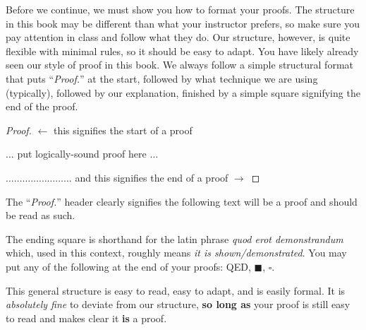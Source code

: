 \documentclass[main.tex]{subfiles}
\begin{document}
Before we continue, we must show you how to format your proofs. The structure in this book may be different than what your instructor prefers, so make sure you pay attention in class and follow what they do. Our structure, however, is quite flexible with minimal rules, so it should be easy to adapt. You have likely already seen our style of proof in this book. We always follow a simple structural format that puts ``\textit{Proof.}'' at the start, followed by what technique we are using (typically), followed by our explanation, finished by a simple square signifying the end of the proof.

\begin{proof}
	\(\leftarrow\) this signifies the start of a proof
	
	\vspace{2em}
	
	\begin{center}
		\(\dots\) put logically-sound proof here \(\dots\)
	\end{center}
	
	\vspace{2em}
	
	\hfill \(\dots \dots \dots \dots \dots \dots \dots \dots \) and this signifies the end of a proof \(\rightarrow\)
\end{proof}

The ``\textit{Proof.}'' header clearly signifies the following text will be a proof and should be read as such.

The ending square is shorthand for the latin phrase \textit{quod erot demonstrandum} which, used in this context, roughly means \textit{it is shown/demonstrated}. You may put any of the following at the end of your proofs: QED, \(\blacksquare\), \(\square\).

This general structure is easy to read, easy to adapt, and is easily formal. It is \textit{absolutely fine} to deviate from our structure, \textbf{so long as} your proof is still easy to read and makes clear it \textbf{is} a proof.
\end{document}
